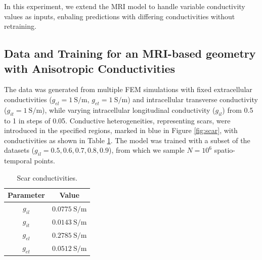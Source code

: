 In this experiment, we extend the MRI model to handle variable conductivity values as inputs, enbaling predictions with differing conductivities without retraining.


\subsection{Data and Training for an MRI-based geometry with Anisotropic Conductivities}

\begin{multicols}{2}
The data was generated from multiple FEM simulations with fixed extracellular conductivities (\(g_{el} = 1~\mathrm{S/m}\), \(g_{et} = 1~\mathrm{S/m}\)) and intracellular transverse conductivity (\(g_{it} = 1~\mathrm{S/m}\)), while varying intracellular longitudinal conductivity (\(g_{il}\)) from 0.5 to 1 in steps of 0.05. Conductive heterogeneities, representing scars, were introduced in the specified regions, marked in blue in Figure \ref{fig:scar}, with conductivities as shown in Table \ref{tab:scar_conductivities}. 
The model was trained with a subset of the datasets ($g_{il}=0.5,0.6,0.7,0.8,0.9$), from which we sample $N=10^6$ spatio-temporal points.

\begin{table}[H]
  \centering
  \begin{tabular}{|c|c|}
    \hline
    Parameter & Value \\ \hline
    $g_{il}$ & $0.0775~\mathrm{S/m}$ \\ \hline
    $g_{it}$ & $0.0143~\mathrm{S/m}$ \\ \hline
    $g_{el}$ & $0.2785~\mathrm{S/m}$ \\ \hline
    $g_{et}$ & $0.0512~\mathrm{S/m}$ \\ \hline
  \end{tabular}
  \caption{Scar conductivities.}
  \label{tab:scar_conductivities}
\end{table}



\end{multicols}

